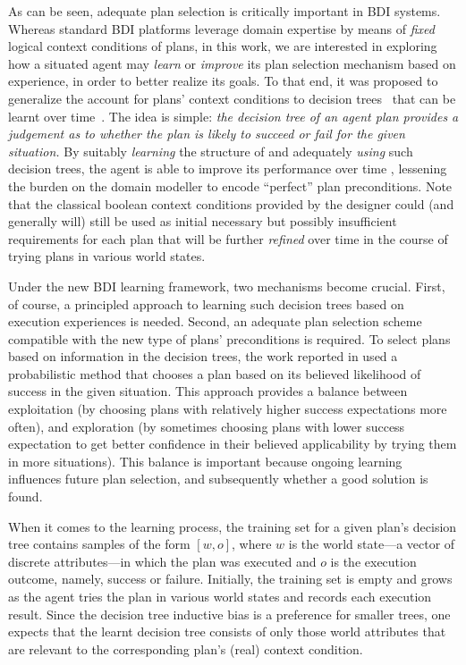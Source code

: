 As can be seen, adequate plan selection is critically important in BDI systems. Whereas standard BDI platforms leverage domain expertise by means of \emph{fixed} logical context conditions of plans, in this work, we are interested in exploring how a situated agent may \emph{learn} or \emph{improve} its plan selection mechanism based on experience, in order to better realize its goals.
To that end, it was proposed to generalize the account for plans' context conditions to decision trees~\cite{Mitchell97:ML} that can be learnt over time~\cite{airiau09:enhancing,singh10:extending,singh10:learning}. The idea is simple: \emph{the decision tree of an agent plan provides a judgement as to whether the plan is likely to succeed or fail for the given situation.}
By suitably \emph{learning} the structure of and adequately \emph{using} such decision trees, the agent is able to improve its performance over time 
, lessening the burden on
the domain modeller to encode ``perfect'' plan preconditions. Note that the classical boolean context conditions provided by the designer could (and generally will) still be used as initial necessary but possibly insufficient requirements for each plan that will be further \emph{refined} over time in the course of trying plans in various world states.


Under the new BDI learning framework, two mechanisms become crucial. First, of course, a principled approach to learning such decision trees based on execution experiences is needed. Second, an adequate plan selection scheme compatible with the new type of plans' preconditions is required.
To select plans based on information in the decision trees, the work reported in \cite{singh10:extending,singh10:learning} used a probabilistic method that chooses a plan based on its believed likelihood of success in the given situation. This approach provides a balance between exploitation (by choosing plans with relatively higher success expectations more often), and exploration (by sometimes choosing plans with lower success expectation to get better confidence in their believed applicability by trying them in more situations). This balance is important because ongoing learning influences future plan selection, and subsequently whether a good solution is found.

When it comes to the learning process, the training set for a given plan's decision tree contains samples of the form $[w, o]$, where $w$ is the world state---a vector of discrete attributes---in which the plan was executed and $o$ is the execution outcome, namely, success or failure. Initially, the training set is empty and grows as the agent tries the plan in various world states and records each execution result. 
Since the decision tree inductive bias is a preference for smaller trees, one expects that the learnt decision tree consists of only those world attributes that are relevant to the corresponding plan's (real) context condition.

